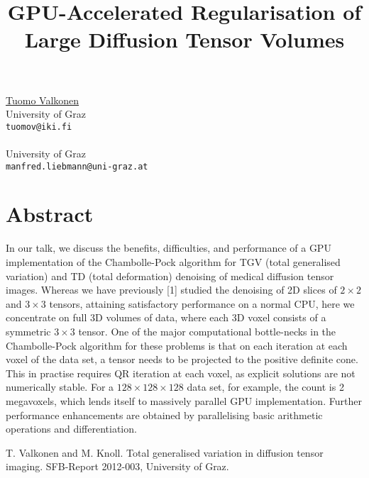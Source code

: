 \title{GPU-Accelerated Regularisation of Large Diffusion Tensor Volumes}
 \author{} \institute{}
\maketitle
\begin{center}
{\large \underline{Tuomo Valkonen}}\\
University of Graz\\
{\tt tuomov@iki.fi}
\\ \vspace{4mm}{\large Manfred Liebmann}\\
University of Graz\\
{\tt manfred.liebmann@uni-graz.at}

\end{center}

\section*{Abstract}

In our talk, we discuss the benefits, difficulties, and performance of a GPU implementation of the Chambolle-Pock algorithm for TGV (total generalised variation) and TD (total deformation) denoising of medical diffusion tensor images. Whereas we have previously [1] studied the denoising of 2D slices of $2 \times 2$ and $3 \times 3$ tensors, attaining satisfactory performance on a normal CPU, here we concentrate on full 3D volumes of data, where each 3D voxel consists of a symmetric $3 \times 3$ tensor. One of the major computational bottle-necks in the Chambolle-Pock algorithm for these
problems is that on each iteration at each voxel of the data set, a tensor needs to be projected to the positive definite cone. This in practise requires QR iteration at each voxel, as explicit solutions are not numerically stable. For a $128 \times 128 \times 128$ data set, for example, the count is 2 megavoxels, which lends itself to massively parallel GPU implementation. Further performance enhancements are obtained by parallelising basic arithmetic operations and differentiation.



\begin{thebibliography}{10}

{\sc T. Valkonen and M. Knoll}. {Total generalised variation in diffusion tensor imaging}. SFB-Report  2012-003, University of Graz.

\end{thebibliography}
